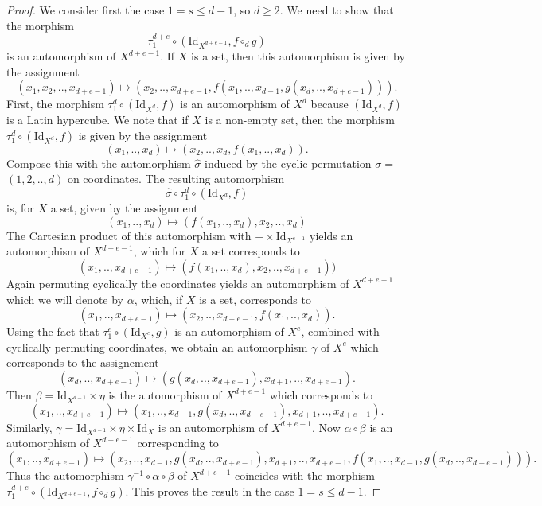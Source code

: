 \documentclass{amsart} %
\theoremstyle{plain}\newtheorem{Theorem}{Theorem}[section]
\theoremstyle{plain}\newtheorem{Conjecture}[Theorem]{Conjecture}
\theoremstyle{plain}\newtheorem{Corollary}[Theorem]{Corollary}
\theoremstyle{plain}\newtheorem{Lemma}[Theorem]{Lemma}
\theoremstyle{plain}\newtheorem{Proposition}[Theorem]{Proposition}
\theoremstyle{definition}\newtheorem{Definition}[Theorem]{Definition}
\theoremstyle{definition}\newtheorem{Example}[Theorem]{Example}
\theoremstyle{definition}\newtheorem{Examples}[Theorem]{Examples}
\theoremstyle{definition}\newtheorem{Remark}[Theorem]{Remark}
\theoremstyle{definition}\newtheorem{Remarks}[Theorem]{Remarks}
\theoremstyle{plain}\newtheorem{Statement}[Theorem]{}
\def\Id{\mathrm{Id}}             \def\tenA{\otimes_A}
\begin{document}
\begin{proof}
\medskip
We consider first the case $1=s\leq d-1$, so $d\geq 2$. We need to show that the morphism
$$\tau^{d+e}_1\circ (\Id_{X^{d+e-1}}, f\circ_d g)$$
is an automorphism of $X^{d+e-1}$. If $X$ is a set, then  this automorphism is given by 
the assignment
$$(x_1,x_2,..,x_{d+e-1}) \mapsto (x_2,..,x_{d+e-1}, f(x_1,..,x_{d-1},g(x_d,..,x_{d+e-1}))).$$
First, the morphism $\tau^d_1\circ (\Id_{X^d}, f)$ is an automorphism of $X^d$ because
$(\Id_{X^d},f)$ is a Latin hypercube. We note that if $X$ is a non-empty set, then the morphism 
$\tau^d_1\circ (\Id_{X^d}, f)$ is given by the assignment 
$$(x_1,..,x_d) \mapsto (x_2,..,x_d, f(x_1,..,x_d)).$$
Compose this with the automorphism $\hat\sigma$
induced by the cyclic permutation $\sigma=$ $(1,2,..,d)$ on coordinates. 
The resulting automorphism
$$\hat\sigma\circ\tau^d_1\circ (\Id_{X^d},f)$$
is, for $X$ a set, given by the assignment
$$(x_1,..,x_d) \mapsto (f(x_1,..,x_d),x_2,..,x_d)$$
The Cartesian product  of this automorphism with $-\times \Id_{X^{e-1}}$ yields
an automorphism of $X^{d+e-1}$, which for $X$ a set corresponds to 
$$(x_1,..,x_{d+e-1}) \mapsto (f(x_1,..,x_d),x_2,..,x_{d+e-1}))$$
Again permuting cyclically the coordinates yields an automorphism of $X^{d+e-1}$ 
which we will denote by $\alpha$, which, if
$X$ is a set,  corresponds to
$$(x_1,..,x_{d+e-1}) \mapsto (x_2,..,x_{d+e-1}, f(x_1,..,x_d)).$$
Using the fact that $\tau^e_1\circ (\Id_{X^e}, g)$ is an automorphism of $X^e$,
combined with cyclically permuting coordinates, we obtain an automorphism
$\gamma$ of $X^e$ which corresponds to the assignement
$$(x_d,..,x_{d+e-1}) \mapsto (g(x_d,..,x_{d+e-1}), x_{d+1},..,x_{d+e-1}).$$
Then $\beta = \Id_{X^{d-1}}\times \eta$ is the automorphism of $X^{d+e-1}$
which corresponds to
$$(x_1,..,x_{d+e-1}) \mapsto (x_1,..,x_{d-1}, g(x_d,..,x_{d+e-1}), x_{d+1},..,x_{d+e-1}).$$
Similarly, $\gamma=\Id_{X^{d-1}}\times \eta \times \Id_X$ is an automorphism of 
$X^{d+e-1}$.
Now $\alpha\circ\beta$ is an automorphism of $X^{d+e-1}$ corresponding to
$$(x_1,..,x_{d+e-1}) \mapsto (x_2,..,x_{d-1},g(x_d,..,x_{d+e-1}),x_{d+1},..,x_{d+e-1},
f(x_1,..,x_{d-1}, g(x_d,..,x_{d+e-1}))).$$
Thus the automorphism $\gamma^{-1}\circ\alpha\circ\beta$ of $X^{d+e-1}$
coincides with the morphism $\tau^{d+e}_1\circ (\Id_{X^{d+e-1}}, f\circ_d g)$.
This proves the result in  the case $1=s\leq d-1$.


\end{proof}
\end{document}
